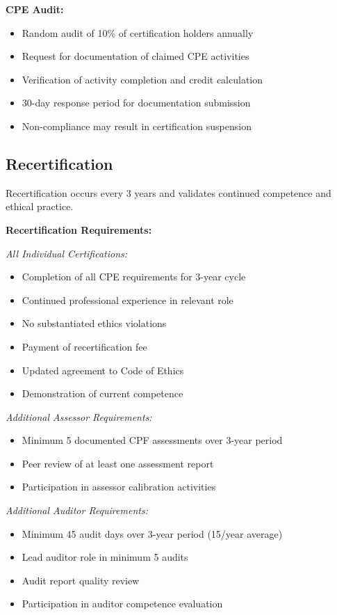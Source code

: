 \documentclass[11pt,a4paper]{article}
\begin{document}
\textbf{CPE Audit:}
\begin{itemize}
\item Random audit of 10\% of certification holders annually
\item Request for documentation of claimed CPE activities
\item Verification of activity completion and credit calculation
\item 30-day response period for documentation submission
\item Non-compliance may result in certification suspension
\end{itemize}

\subsection{Recertification}

Recertification occurs every 3 years and validates continued competence and ethical practice.

\textbf{Recertification Requirements:}

\textit{All Individual Certifications:}
\begin{itemize}
\item Completion of all CPE requirements for 3-year cycle
\item Continued professional experience in relevant role
\item No substantiated ethics violations
\item Payment of recertification fee
\item Updated agreement to Code of Ethics
\item Demonstration of current competence
\end{itemize}

\textit{Additional Assessor Requirements:}
\begin{itemize}
\item Minimum 5 documented CPF assessments over 3-year period
\item Peer review of at least one assessment report
\item Participation in assessor calibration activities
\end{itemize}

\textit{Additional Auditor Requirements:}
\begin{itemize}
\item Minimum 45 audit days over 3-year period (15/year average)
\item Lead auditor role in minimum 5 audits
\item Audit report quality review
\item Participation in auditor competence evaluation
\end{itemize}
\end{document}
